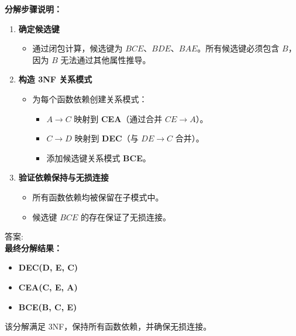 \textbf{分解步骤说明：}
\begin{enumerate}
    \item \textbf{确定候选键}
    \begin{itemize}
        \item 通过闭包计算，候选键为 \( BCE \)、\( BDE \)、\( BAE \)。所有候选键必须包含 \( B \)，因为 \( B \) 无法通过其他属性推导。
    \end{itemize}

    \item \textbf{构造 3NF 关系模式}
    \begin{itemize}
        \item 为每个函数依赖创建关系模式：
        \begin{itemize}
            \item \( A \rightarrow C \) 映射到 \textbf{CEA}（通过合并 \( CE \rightarrow A \)）。
            \item \( C \rightarrow D \) 映射到 \textbf{DEC}（与 \( DE \rightarrow C \) 合并）。
            \item 添加候选键关系模式 \textbf{BCE}。
        \end{itemize}
    \end{itemize}

    \item \textbf{验证依赖保持与无损连接}
    \begin{itemize}
        \item 所有函数依赖均被保留在子模式中。
        \item 候选键 \( BCE \) 的存在保证了无损连接。
    \end{itemize}
\end{enumerate}
答案:\\
\textbf{最终分解结果：}
\begin{itemize}
    \item \textbf{DEC(D, E, C)}
    \item \textbf{CEA(C, E, A)}
    \item \textbf{BCE(B, C, E)}
\end{itemize}

该分解满足 3NF，保持所有函数依赖，并确保无损连接。